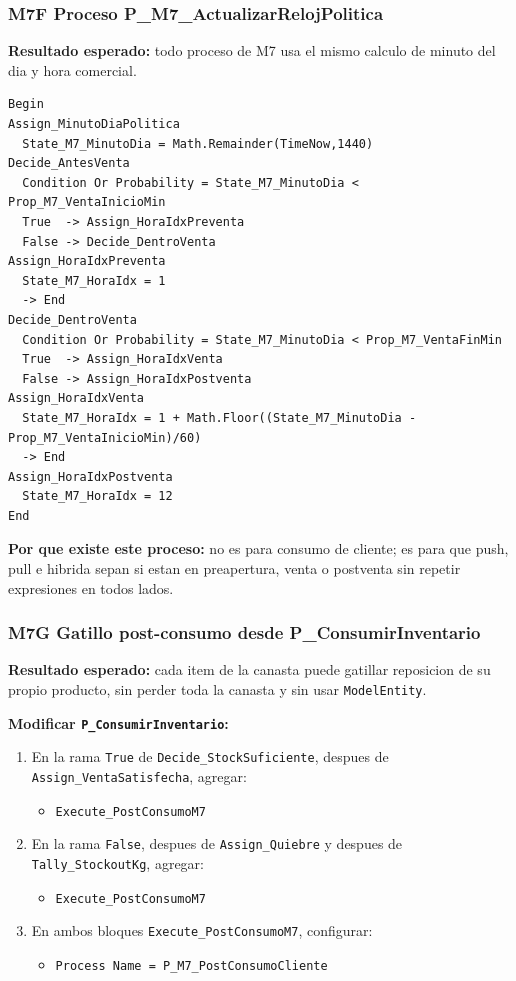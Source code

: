 \documentclass[11pt]{article}
\newcommand{\simio}[1]{\texttt{#1}}
\newcommand{\proc}[1]{\texttt{#1}}
\begin{document}
\subsubsection{M7F Proceso P\_M7\_ActualizarRelojPolitica}
\textbf{Resultado esperado:} todo proceso de M7 usa el mismo calculo de minuto del dia y hora comercial.

\begin{lstlisting}[caption={Bloques de P M7 ActualizarRelojPolitica}]
Begin
Assign_MinutoDiaPolitica
  State_M7_MinutoDia = Math.Remainder(TimeNow,1440)
Decide_AntesVenta
  Condition Or Probability = State_M7_MinutoDia < Prop_M7_VentaInicioMin
  True  -> Assign_HoraIdxPreventa
  False -> Decide_DentroVenta
Assign_HoraIdxPreventa
  State_M7_HoraIdx = 1
  -> End
Decide_DentroVenta
  Condition Or Probability = State_M7_MinutoDia < Prop_M7_VentaFinMin
  True  -> Assign_HoraIdxVenta
  False -> Assign_HoraIdxPostventa
Assign_HoraIdxVenta
  State_M7_HoraIdx = 1 + Math.Floor((State_M7_MinutoDia - Prop_M7_VentaInicioMin)/60)
  -> End
Assign_HoraIdxPostventa
  State_M7_HoraIdx = 12
End
\end{lstlisting}

\textbf{Por que existe este proceso:} no es para consumo de cliente; es para que push, pull e hibrida sepan si estan en preapertura, venta o postventa sin repetir expresiones en todos lados.

\subsubsection{M7G Gatillo post-consumo desde P\_ConsumirInventario}
\textbf{Resultado esperado:} cada item de la canasta puede gatillar reposicion de su propio producto, sin perder toda la canasta y sin usar \simio{ModelEntity}.

\textbf{Modificar \proc{P\_ConsumirInventario}:}
\begin{enumerate}
  \item En la rama \simio{True} de \simio{Decide\_StockSuficiente}, despues de \simio{Assign\_VentaSatisfecha}, agregar:
  \begin{itemize}
    \item \simio{Execute\_PostConsumoM7}
  \end{itemize}
  \item En la rama \simio{False}, despues de \simio{Assign\_Quiebre} y despues de \simio{Tally\_StockoutKg}, agregar:
  \begin{itemize}
    \item \simio{Execute\_PostConsumoM7}
  \end{itemize}
  \item En ambos bloques \simio{Execute\_PostConsumoM7}, configurar:
  \begin{itemize}
    \item \simio{Process Name = P\_M7\_PostConsumoCliente}
  \end{itemize}
\end{enumerate}
\end{document}
